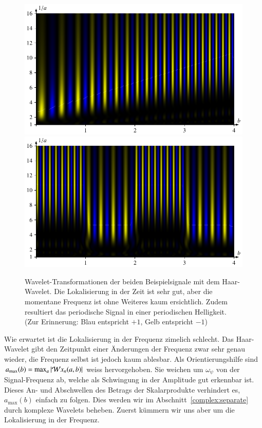 \begin{figure}
	\centering
	\includegraphics{papers/complex/images/chirp_haar.pdf}
	\includegraphics{papers/complex/images/square_haar.pdf}
	\caption{Wavelet-Transformationen der beiden Beispielsignale mit dem Haar-Wavelet. Die Lokalisierung in der Zeit ist sehr gut, aber die momentane Frequenz ist ohne Weiteres kaum ersichtlich. Zudem resultiert das periodische Signal in einer periodischen Helligkeit. (Zur Erinnerung: Blau entspricht $+1$, Gelb entspricht $-1$)}
	\label{complex:haar-ex}
\end{figure}

Wie erwartet ist die Lokalisierung in der Frequenz zimelich schlecht.
Das Haar-Wavelet gibt den Zeitpunkt einer Änderungen der Frequenz zwar sehr genau wieder, die Frequenz selbst ist jedoch kaum ablesbar.
Als Orientierungshilfe sind $a_\text{max} (b) = \max_a{|\!\Wave x_n(a,b)|}$ weiss hervorgehoben.
Sie weichen um $\omega_\psi$ von der Signal-Frequenz ab, welche als Schwingung in der Amplitude gut erkennbar ist.
Dieses An- und Abschwellen des Betrags der Skalarprodukte verhindert es, $a_\text{max}(b)$ einfach zu folgen.
Dies werden wir im Abschnitt~\ref{complex:separate} durch komplexe Wavelets beheben.
Zuerst kümmern wir uns aber um die Lokalisierung in der Frequenz.
